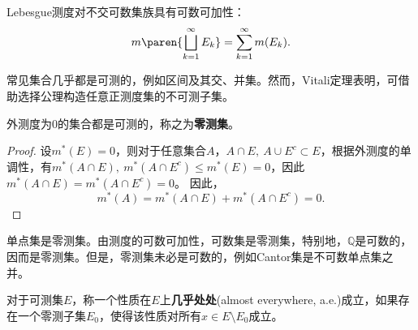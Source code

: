 Lebesgue测度对不交可数集族具有可数可加性：
\begin{equation}
    m\paren{\bigsqcup_{k=1}^{\infty}E_k}=\sum_{k=1}^{\infty}m(E_k).
\end{equation}

常见集合几乎都是可测的，例如区间及其交、并集。然而，Vitali定理\cite{real_analysis}表明，可借助选择公理构造任意正测度集的不可测子集。


\begin{proposition}
    外测度为0的集合都是可测的，称之为\textbf{零测集}。
\end{proposition}
\begin{proof}
    设$m^*(E)=0$，则对于任意集合$A$，$A\cap E,\ A\cup E^c\subset E$，根据外测度的单调性，有$m^*(A\cap E),\ m^*(A\cap E^c)\leq m^*(E)=0$，因此$m^*(A\cap E)=m^*(A\cap E^c)=0$。
    因此，
    \begin{equation}
        m^*(A)=m^*(A\cap E)+m^*(A\cap E^c)=0.
    \end{equation}
\end{proof}

\begin{example}
    单点集是零测集。由测度的可数可加性，可数集是零测集，特别地，$\mathbb{Q}$是可数的，因而是零测集。但是，零测集未必是可数的，例如Cantor集是不可数单点集之并\cite{real_analysis}。
\end{example}

\begin{definition}[几乎处处]
    对于可测集$E$，称一个性质在$E$上\textbf{几乎处处}(almost everywhere, a.e.)成立，如果存在一个零测子集$E_0$，使得该性质对所有$x\in E\setminus E_0$成立。
\end{definition}

